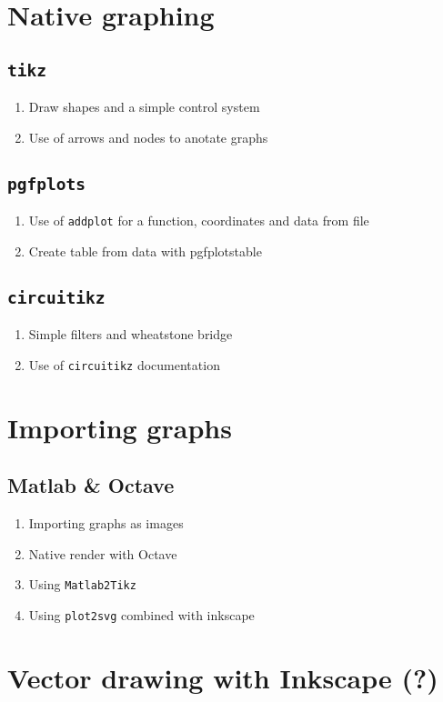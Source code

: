 \section{Native graphing}
    \subsection{\texttt{tikz}}
    \begin{enumerate}
        \item Draw shapes and a simple control system
        \item Use of arrows and nodes to anotate graphs 
    \end{enumerate}
    \subsection{\texttt{pgfplots}}
        \begin{enumerate}
            \item Use of \texttt{addplot} for a function, coordinates and data from file
            \item Create table from data with pgfplotstable
        \end{enumerate}
    \subsection{\texttt{circuitikz}}
        \begin{enumerate}
            \item Simple filters and wheatstone bridge
            \item Use of \texttt{circuitikz} documentation
        \end{enumerate}
\section{Importing graphs}
    \subsection{Matlab \& Octave}
        \begin{enumerate}
            \item Importing graphs as images
            \item Native render with Octave
            \item Using \verb|Matlab2Tikz|
            \item Using \verb|plot2svg| combined with inkscape
        \end{enumerate}
\section{Vector drawing with Inkscape (?)}